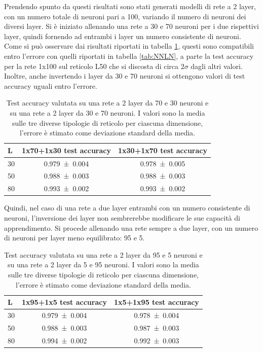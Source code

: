 \documentclass{article}
\begin{document}
Prendendo spunto da questi risultati sono stati generati modelli di rete a 2 layer, con un numero totale di neuroni pari a 100, variando il numero di neuroni dei diversi layer.
 Si è iniziato allenando una rete a 30 e 70 neuroni per i due rispettivi layer, quindi fornendo ad entrambi i layer un numero consistente di neuroni.
Come si può osservare dai risultati riportati in tabella \ref{tab:2LN30-70}, questi sono compatibili entro l'errore con quelli riportati in tabella \ref{tab:NNLN}, a parte la test accuracy per la rete 1x100 sul reticolo L50 che si discosta di circa $2\sigma$ dagli altri valori.
Inoltre, anche invertendo i layer da 30 e 70 neuroni si ottengono valori di test accuracy uguali entro l'errore.

\begin{table}[ht]
\begin{center}
\begin{tabular}{lcc}
\toprule
L & 1x70+1x30 test accuracy & 1x30+1x70 test accuracy\\
\midrule
30 & \num{0.979 \pm 0.004} & \num{0.978 \pm 0.005} \\
50 & \num{0.988 \pm 0.003} & \num{0.988 \pm 0.003} \\
80 & \num{0.993 \pm 0.002} & \num{0.993 \pm 0.002} \\
\bottomrule
\end{tabular}
\end{center}
\caption{Test accuracy valutata su una rete a 2 layer da 70 e 30 neuroni e su una rete a 2 layer da 30 e 70 neuroni. I valori sono la media sulle tre diverse tipologie di reticolo per ciascuna dimensione, l'errore è stimato come deviazione standard della media.}
\label{tab:2LN30-70}
\end{table}

Quindi, nel caso di una rete a due layer entrambi con un numero consistente di neuroni, l'inversione dei layer non sembrerebbe modificare le sue capacità di apprendimento.
Si procede allenando una rete sempre a due layer, con un numero di neuroni per layer meno equilibrato: 95 e 5.

\begin{table}[ht]
\begin{center}
\begin{tabular}{lcc}
\toprule
L & 1x95+1x5 test accuracy & 1x5+1x95 test accuracy\\
\midrule
30 & \num{0.979 \pm 0.004} & \num{0.978 \pm 0.004} \\
50 & \num{0.988 \pm 0.003} & \num{0.987 \pm 0.003} \\
80 & \num{0.994 \pm 0.002} & \num{0.992 \pm 0.003} \\
\bottomrule
\end{tabular}
\end{center}
\caption{Test accuracy valutata su una rete a 2 layer da 95 e 5 neuroni e su una rete a 2 layer da 5 e 95 neuroni. I valori sono la media sulle tre diverse tipologie di reticolo per ciascuna dimensione, l'errore è stimato come deviazione standard della media.}
\label{tab:2LN5-95}
\end{table}
\end{document}

